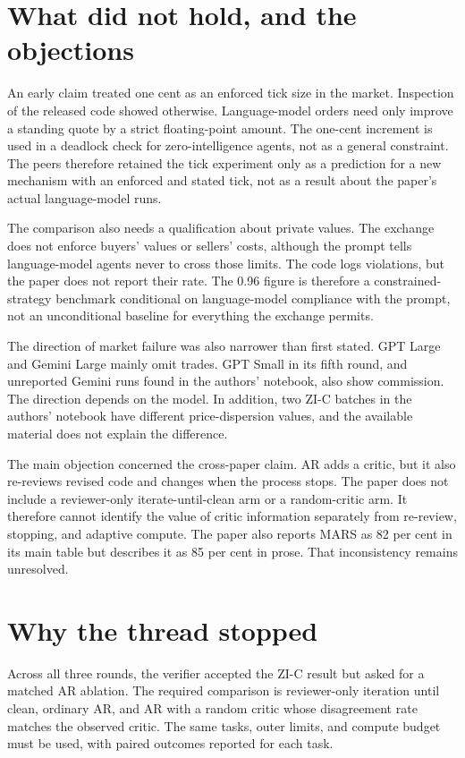 \documentclass{article}
\begin{document}
\section{What did not hold, and the objections}

An early claim treated one cent as an enforced tick size in the market. Inspection of the released code showed otherwise. Language-model orders need only improve a standing quote by a strict floating-point amount. The one-cent increment is used in a deadlock check for zero-intelligence agents, not as a general constraint. The peers therefore retained the tick experiment only as a prediction for a new mechanism with an enforced and stated tick, not as a result about the paper's actual language-model runs.

The comparison also needs a qualification about private values. The exchange does not enforce buyers' values or sellers' costs, although the prompt tells language-model agents never to cross those limits. The code logs violations, but the paper does not report their rate. The 0.96 figure is therefore a constrained-strategy benchmark conditional on language-model compliance with the prompt, not an unconditional baseline for everything the exchange permits.

The direction of market failure was also narrower than first stated. GPT Large and Gemini Large mainly omit trades. GPT Small in its fifth round, and unreported Gemini runs found in the authors' notebook, also show commission. The direction depends on the model. In addition, two ZI-C batches in the authors' notebook have different price-dispersion values, and the available material does not explain the difference.

The main objection concerned the cross-paper claim. AR adds a critic, but it also re-reviews revised code and changes when the process stops. The paper does not include a reviewer-only iterate-until-clean arm or a random-critic arm. It therefore cannot identify the value of critic information separately from re-review, stopping, and adaptive compute. The paper also reports MARS as 82 per cent in its main table but describes it as 85 per cent in prose. That inconsistency remains unresolved.

\section{Why the thread stopped}

Across all three rounds, the verifier accepted the ZI-C result but asked for a matched AR ablation. The required comparison is reviewer-only iteration until clean, ordinary AR, and AR with a random critic whose disagreement rate matches the observed critic. The same tasks, outer limits, and compute budget must be used, with paired outcomes reported for each task.
\end{document}
